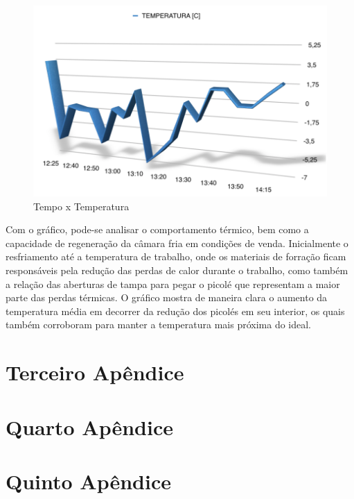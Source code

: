 \begin{apendicesenv}
        \begin{figure}[H]
	\centering
    \includegraphics[width=\textwidth]{figuras/temperatura}
    \caption{Tempo x Temperatura}
    \label{fig:temperatura}
\end{figure}
	Com o gráfico, pode-se analisar o comportamento térmico, bem como a capacidade de regeneração da câmara fria em condições de venda. Inicialmente o resfriamento até a temperatura de trabalho, onde os materiais de forração ficam responsáveis pela redução das perdas de calor durante o trabalho, como também a relação das aberturas de tampa para pegar o picolé que representam a maior parte das perdas térmicas. O gráfico mostra de maneira clara o aumento da temperatura média em decorrer da redução dos picolés em seu interior, os quais também corroboram para manter a temperatura mais próxima do ideal.
	
\chapter{Terceiro Apêndice}
\label{app:freezer}


\chapter{Quarto Apêndice}
\label{app:estante}

\chapter{Quinto Apêndice}
\label{app:visao_explodida}


\end{apendicesenv}
